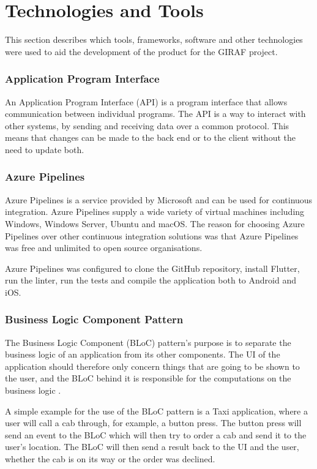 \section{Technologies and Tools} 
This section describes which tools, frameworks, software and other technologies were used to aid the development of the product for the GIRAF project. 

\subsubsection{Application Program Interface}
An Application Program Interface (API) is a program interface that allows communication between individual programs.
The API is a way to interact with other systems, by sending and receiving data over a common protocol. This means that changes can be made to the back end or to the client without the need to update both. \citep{cite:API}

\subsubsection{Azure Pipelines}
Azure Pipelines is a service provided by Microsoft and can be used for continuous integration. Azure Pipelines supply a wide variety of virtual machines including Windows, Windows Server, Ubuntu and macOS. The reason for choosing Azure Pipelines over other continuous integration solutions was that Azure Pipelines was free and unlimited to open source organisations.

Azure Pipelines was configured to clone the GitHub repository, install Flutter, run the linter, run the tests and compile the application both to Android and iOS. 

\subsubsection{Business Logic Component Pattern}
The Business Logic Component (BLoC) pattern's purpose is to separate the business logic of an application from its other components. The UI of the application should therefore only concern things that are going to be shown to the user, and the BLoC behind it is responsible for the computations on the business logic \citep{cite:blocPattern}. 

A simple example for the use of the BLoC pattern is a Taxi application, where a user will call a cab through, for example, a button press. The button press will send an event to the BLoC which will then try to order a cab and send it to the user’s location. The BLoC will then send a result back to the UI and the user, whether the cab is on its way or the order was declined.

